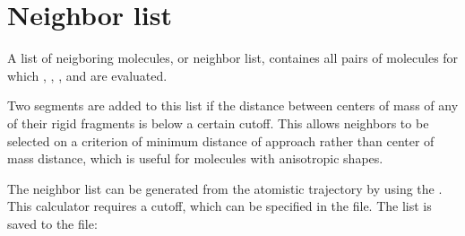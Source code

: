 \section{Neighbor list}
A list of neigboring molecules, or neighbor list, containes all pairs of molecules for which , , , and  are evaluated.

Two segments are added to this list if the distance between centers of mass of any of their rigid fragments is below a certain cutoff. This allows neighbors to be selected on a criterion of minimum distance of approach rather than center of mass distance, which is useful for molecules with anisotropic shapes.

The neighbor list can be generated from the atomistic trajectory by using the  \calculator. This calculator requires a cutoff, which can be specified in the \xmloptions file. The list is saved to the \sqlstate file:

{\small \ctprun \opt \xmloptions  \seg  \xmlsegments \sql  \sqlstate \exe  {}}
